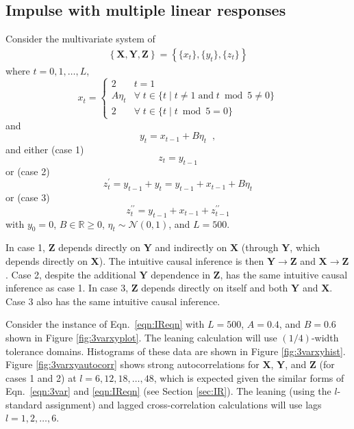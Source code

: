 \subsection{Impulse with multiple linear responses}
\label{sec:3var}
Consider the multivariate system of
\begin{eqnarray}
\label{eqn:3var}
\left\{\mathbf{X},\mathbf{Y},\mathbf{Z}\right\} = \left\{\{x_t\},\{y_t\},\{z_t\}\right\}
\end{eqnarray}
where $t=0,1,\ldots,L$,
\begin{equation*}
x_t = \left\{
  \begin{array}{lr}
    2 & t = 1\\
    A\eta_t & \forall\; t\in\{t\;|\;t\neq 1 \;\mathrm{and}\; t\bmod 5 \neq 0\}\\
    2 & \forall\; t\in\{t\;|\;t\bmod 5 = 0\}
  \end{array}
\right.
\end{equation*}
and
\begin{equation*}
y_t = x_{t-1} + B\eta_t\;\;,
\end{equation*}
and either (case 1)
\begin{equation}
z_t = y_{t-1}
\end{equation}
or (case 2)
\begin{equation}
z_t^\prime = y_{t-1} + y_t = y_{t-1} + x_{t-1} + B\eta_t
\end{equation}
or (case 3)
\begin{equation}
z_t^{\prime\prime} = y_{t-1} + x_{t-1} + z_{t-1}^{\prime\prime}
\end{equation}
with $y_0 = 0$, $B\in\mathbb{R}\ge 0$, $\eta_t\sim\mathcal{N}\left(0,1\right)$, and $L=500$.

In case 1, $\mathbf{Z}$ depends directly on $\mathbf{Y}$ and indirectly on $\mathbf{X}$ (through $\mathbf{Y}$, which depends directly on $\mathbf{X}$).  The intuitive causal inference is then $\mathbf{Y}\rightarrow\mathbf{Z}$ and $\mathbf{X}\rightarrow\mathbf{Z}$.  Case 2, despite the additional $\mathbf{Y}$ dependence in $\mathbf{Z}$, has the same intuitive causal inference as case 1.  In case 3, $\mathbf{Z}$ depends directly on itself and both $\mathbf{Y}$ and $\mathbf{X}$.  Case 3 also has the same intuitive causal inference.

Consider the instance of Eqn.\ \ref{eqn:IReqn} with $L=500$, $A=0.4$, and $B=0.6$ shown in Figure \ref{fig:3varxyplot}.  The leaning calculation will use $(1/4)$-width tolerance domains.  Histograms of these data are shown in Figure \ref{fig:3varxyhist}.  Figure \ref{fig:3varxyautocorr} shows strong autocorrelations for $\mathbf{X}$, $\mathbf{Y}$, and $\mathbf{Z}$ (for cases 1 and 2) at $l=6,12,18,\ldots,48$, which is expected given the similar forms of Eqn.\ \ref{eqn:3var} and \ref{eqn:IReqn} (see Section \ref{sec:IR}).  The leaning (using the $l$-standard assignment) and lagged cross-correlation calculations will use lags $l=1,2,\ldots,6$.  


